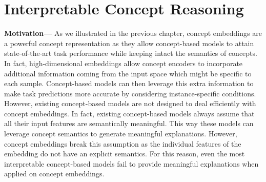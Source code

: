 \chapter{Interpretable Concept Reasoning}
\label{chapter:DCR}


\textbf{Motivation---} As we illustrated in the previous chapter, concept embeddings are a powerful concept representation as they allow concept-based models to attain state-of-the-art task performance while keeping intact the semantics of concepts. In fact, high-dimensional embeddings allow concept encoders to incorporate additional information coming from the input space which might be specific to each sample. Concept-based models can then leverage this extra information to make task predictions more accurate by considering instance-specific conditions. However, existing concept-based models are not designed to deal efficiently with concept embeddings. In fact, existing concept-based models always assume that all their input features are semantically meaningful. This way these models can leverage concept semantics to generate meaningful explanations. However, concept embeddings break this assumption as the individual features of the embedding do not have an explicit semantics. For this reason, even the most interpretable concept-based models fail to provide meaningful explanations when applied on concept embeddings.

